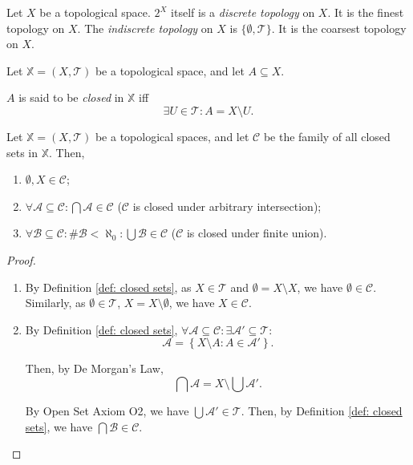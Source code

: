\begin{example}
	Let $X$ be a topological space. $2^X$ itself is a \textit{discrete topology} on $X$. It is the finest topology on $X$. The \textit{indiscrete topology} on $X$ is $\{ \emptyset, \mathcal T \}$. It is the coarsest topology on $X$.
\end{example}


\begin{definition}
	\label{def: closed sets}
	Let $\mathbb X = (X, \mathcal T)$ be a topological space, and let $A \subseteq X$.
	
	$A$ is said to be \textit{closed} in $\mathbb X$ iff
	$$
	\exists U \in \mathcal T: A = X \setminus U.
	$$
\end{definition}


\begin{lemma}
	\label{lm: closed sets axioms}
	
	Let $\mathbb X = (X, \mathcal T)$ be a topological spaces, and let $\mathcal C$ be the family of all closed sets in $\mathbb X$. Then,
	\begin{enumerate}[C1.]
		\item $\emptyset, X \in \mathcal C$;
		\item $\forall \mathcal A \subseteq \mathcal C: \bigcap \mathcal A \in \mathcal C$ ($\mathcal C$ is closed under arbitrary intersection);
		\item $\forall \mathcal B \subseteq \mathcal C: \# \mathcal B < \aleph_0: \bigcup \mathcal B \in \mathcal C$ ($\mathcal C$ is closed under finite union).
	\end{enumerate}
	
	\begin{proof}		
		\begin{enumerate}[C1.]
			\item
			By Definition \ref{def: closed sets}, as $X \in \mathcal T$ and $\emptyset = X \setminus X$, we have $\emptyset \in \mathcal C$. Similarly, as $\emptyset \in \mathcal T$, $X = X \setminus \emptyset$, we have $X \in \mathcal C$.
				\qedlm
				
			\item
			By Definition \ref{def: closed sets}, $\forall \mathcal A \subseteq \mathcal C: \exists \mathcal A' \subseteq \mathcal T:$
			$$
			\mathcal A = \left\{ X \setminus A : A \in \mathcal A' \right\}.
			$$
	
			Then, by De Morgan's Law,
			$$
			\bigcap \mathcal A = X \setminus \bigcup \mathcal A'.
			$$
			
			By Open Set Axiom O2, we have $\bigcup \mathcal A' \in \mathcal T$. Then, by Definition \ref{def: closed sets}, we have $\bigcap \mathcal B \in \mathcal C$.
			\qedlm
			

\end{enumerate}
\end{proof}
\end{lemma}
